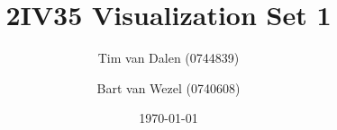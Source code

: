 \documentclass[a4paper,11pt]{article}
\title{
	2IV35 Visualization Set 1 \\
}
\author{
	Tim van Dalen (0744839)
	\and
	Bart van Wezel (0740608)
}
\date{\today}
\begin{document}
	\maketitle
	\newpage
	
	\newpage
	

	

	

	
	
	\newpage
	\begin{appendix}
	\label{City}
	\end{appendix}
\end{document}
